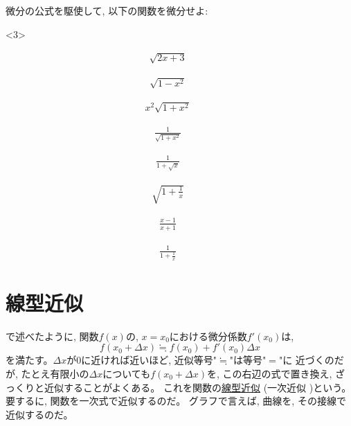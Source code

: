 \begin{q}\label{q:diff_func8} 微分の公式を駆使して, 以下の関数を微分せよ:
\begin{edaenumerate}<3>
\item \begin{eqnarray*}\sqrt{2x+3}\,\,\,\,\,\,\,\,\,\,\,\,\,\,\,\end{eqnarray*}
\item \begin{eqnarray*}\sqrt{1-x^2}\,\,\,\,\,\,\,\,\,\,\,\,\,\,\,\end{eqnarray*}
\item \begin{eqnarray*}x^2\sqrt{1+x^2}\,\,\,\,\,\,\,\,\,\,\,\,\,\,\,\end{eqnarray*}
\item \begin{eqnarray*}\frac{1}{\sqrt{1+x^2}}\,\,\,\,\,\,\,\,\,\,\,\,\,\,\,\end{eqnarray*}
\item \begin{eqnarray*}\frac{1}{1+\sqrt{x}}\,\,\,\,\,\,\,\,\,\,\,\,\,\,\,\end{eqnarray*}
\item \begin{eqnarray*}\sqrt{1+\frac{1}{x}}\,\,\,\,\,\,\,\,\,\,\,\,\,\,\,\end{eqnarray*}
\item \begin{eqnarray*}\frac{x-1}{x+1}\,\,\,\,\,\,\,\,\,\,\,\,\,\,\,\end{eqnarray*}
\item \begin{eqnarray*}\frac{1}{1+\frac{1}{x}}\,\,\,\,\,\,\,\,\,\,\,\,\,\,\,\end{eqnarray*}
\end{edaenumerate}\end{q}
\vv



\section{線型近似}

で述べたように, 関数$f(x)$の, $x=x_0$における微分係数$f'(x_0)$は,
\begin{equation}
f(x_0+\Delta x) \fallingdotseq f(x_0) + f'(x_0) \Delta x
\end{equation}
を満たす。$\Delta x$が0に近ければ近いほど, 近似等号"$\fallingdotseq$"は等号"$=$"に
近づくのだが, たとえ有限小の$\Delta x$についても$f(x_0+\Delta x)$を, 
この右辺の式で置き換え, ざっくりと近似することがよくある。
これを関数の\underline{線型近似}  (一次近似
)という。要するに, 関数を一次式で近似するのだ。
グラフで言えば, 曲線を, その接線で近似するのだ。

